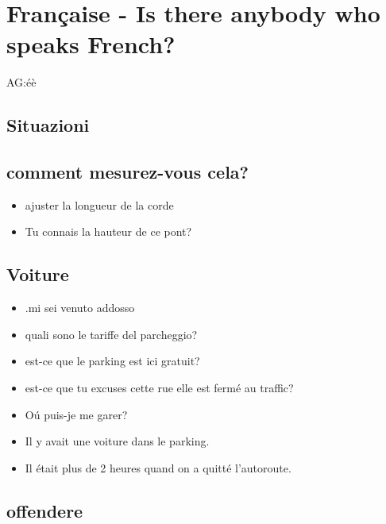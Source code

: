 \section{Fran\c{c}aise - Is there anybody who speaks French?}%
AG:\'e\`e
\subsection{Situazioni}

\subsection{comment mesurez-vous cela?}

\begin{itemize}

\item ajuster la longueur de la corde

\item Tu connais la hauteur de ce pont?

\end{itemize}

\subsection{Voiture}

\begin{itemize}

\item .mi sei venuto addosso

\item quali sono le tariffe del parcheggio?

\item est-ce que le parking est ici gratuit?

\item est-ce que tu excuses cette rue elle est ferm\'e au traffic?

\item O\'u puis-je me garer?

\item Il y avait une voiture dans le parking.

\item Il \'etait plus de 2 heures quand on a quitt\'e l'autoroute.

\end{itemize}

\subsection{offendere}

